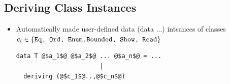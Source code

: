 \documentclass{article}
\newcommand{\Haskell}[1]{\texttt{#1}}
\begin{document}
\subsection{Deriving Class Instances}
\begin{itemize}
\item Automatically made user-defined data (data ...) intsances of classes $c_i \in \{\text{\Haskell{Eq, Ord, Enum,Bounded, Show, Read}}\}$
\begin{verbatim}
data T @$a_1$@ @$a_2$@ ... @$a_n$@ = ...
                       |
  deriving (@$c_1$@..,@$c_n$@)
\end{verbatim}
\end{itemize}
\inputminted{Haskell}{RockPaperScissor-deriving.hs}
\end{document}
